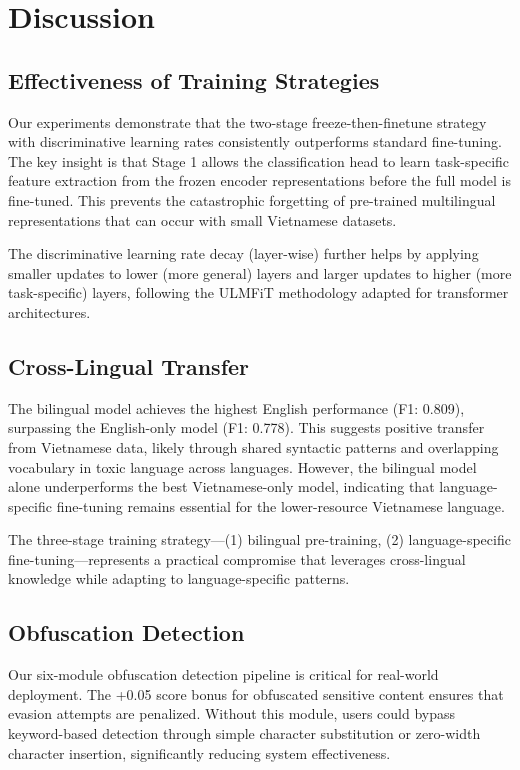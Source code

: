 \documentclass[12pt,a4paper]{article}
\begin{document}
\section{Discussion}
\label{sec:discussion}

\subsection{Effectiveness of Training Strategies}

Our experiments demonstrate that the two-stage freeze-then-finetune strategy with discriminative learning rates consistently outperforms standard fine-tuning.
The key insight is that Stage 1 allows the classification head to learn task-specific feature extraction from the frozen encoder representations before the full model is fine-tuned.
This prevents the catastrophic forgetting of pre-trained multilingual representations that can occur with small Vietnamese datasets.

The discriminative learning rate decay (layer-wise) further helps by applying smaller updates to lower (more general) layers and larger updates to higher (more task-specific) layers, following the ULMFiT methodology adapted for transformer architectures.

\subsection{Cross-Lingual Transfer}

The bilingual model achieves the highest English performance (F1: 0.809), surpassing the English-only model (F1: 0.778).
This suggests positive transfer from Vietnamese data, likely through shared syntactic patterns and overlapping vocabulary in toxic language across languages.
However, the bilingual model alone underperforms the best Vietnamese-only model, indicating that language-specific fine-tuning remains essential for the lower-resource Vietnamese language.

The three-stage training strategy---(1) bilingual pre-training, (2) language-specific fine-tuning---represents a practical compromise that leverages cross-lingual knowledge while adapting to language-specific patterns.

\subsection{Obfuscation Detection}

Our six-module obfuscation detection pipeline is critical for real-world deployment.
The +0.05 score bonus for obfuscated sensitive content ensures that evasion attempts are penalized.
Without this module, users could bypass keyword-based detection through simple character substitution or zero-width character insertion, significantly reducing system effectiveness.
\end{document}
